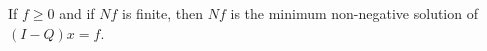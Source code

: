 If $f \geq 0$ and if $Nf$ is finite, then $Nf$ is the minimum non-negative solution of $(I - Q)x = f$.
